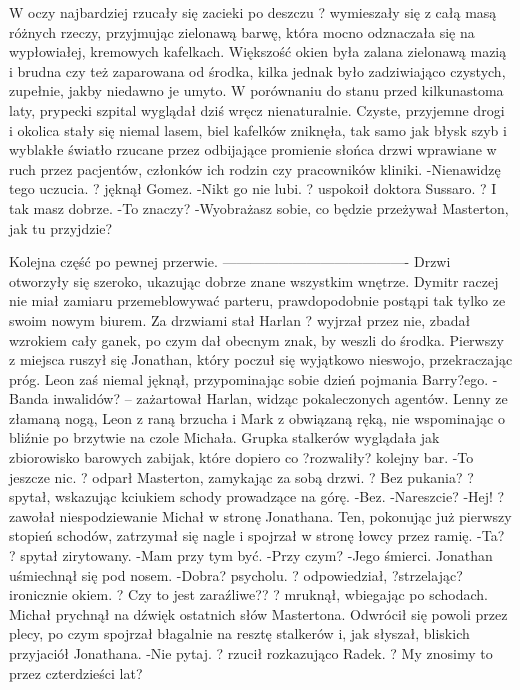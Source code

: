 \documentclass[../MAIN.tex]{subfiles}
\begin{document}
W oczy najbardziej rzucały się zacieki po deszczu ? wymieszały się z całą masą różnych rzeczy, przyjmując zielonawą barwę, która mocno odznaczała się na wypłowiałej, kremowych kafelkach.
Większość okien była zalana zielonawą mazią i brudna czy też zaparowana od środka, kilka jednak było zadziwiająco czystych, zupełnie, jakby niedawno je umyto.
W porównaniu do stanu przed kilkunastoma laty, prypecki szpital wyglądał dziś wręcz nienaturalnie.
Czyste, przyjemne drogi i okolica stały się niemal lasem, biel kafelków zniknęła, tak samo jak błysk szyb i wyblakłe światło rzucane przez odbijające promienie słońca drzwi wprawiane w ruch przez pacjentów, członków ich rodzin czy pracowników kliniki.
-Nienawidzę tego uczucia. ? jęknął Gomez.
-Nikt go nie lubi. ? uspokoił doktora Sussaro. ? I tak masz dobrze.
-To znaczy?
-Wyobrażasz sobie, co będzie przeżywał Masterton, jak tu przyjdzie?

Kolejna część po pewnej przerwie.
----------------------------------------
Drzwi otworzyły się szeroko, ukazując dobrze znane wszystkim wnętrze. Dymitr raczej nie miał zamiaru przemeblowywać parteru, prawdopodobnie postąpi tak tylko ze swoim nowym biurem.
Za drzwiami stał Harlan ? wyjrzał przez nie, zbadał wzrokiem cały ganek, po czym dał obecnym znak, by weszli do środka. Pierwszy z miejsca ruszył się Jonathan, który poczuł się wyjątkowo nieswojo, przekraczając próg. Leon zaś niemal jęknął, przypominając sobie dzień pojmania Barry?ego.
-Banda inwalidów? -- zażartował Harlan, widząc pokaleczonych agentów. Lenny ze złamaną nogą, Leon z raną brzucha i Mark z obwiązaną ręką, nie wspominając o bliźnie po brzytwie na czole Michała. Grupka stalkerów wyglądała jak zbiorowisko barowych zabijak, które dopiero co ?rozwaliły? kolejny bar.
-To jeszcze nic. ? odparł Masterton, zamykając za sobą drzwi. ? Bez pukania? ? spytał, wskazując kciukiem schody prowadzące na górę.
-Bez.
-Nareszcie?
-Hej! ? zawołał niespodziewanie Michał w stronę Jonathana. Ten, pokonując już pierwszy stopień schodów, zatrzymał się nagle i spojrzał w stronę łowcy przez ramię.
-Ta? ? spytał zirytowany.
-Mam przy tym być.
-Przy czym?
-Jego śmierci.
Jonathan uśmiechnął się pod nosem.
-Dobra? psycholu. ? odpowiedział, ?strzelając? ironicznie okiem. ? Czy to jest zaraźliwe?? ? mruknął, wbiegając po schodach.
Michał prychnął na dźwięk ostatnich słów Mastertona. Odwrócił się powoli przez plecy, po czym spojrzał błagalnie na resztę stalkerów i, jak słyszał, bliskich przyjaciół Jonathana.
-Nie pytaj. ? rzucił rozkazująco Radek. ? My znosimy to przez czterdzieści lat?
\end{document}
